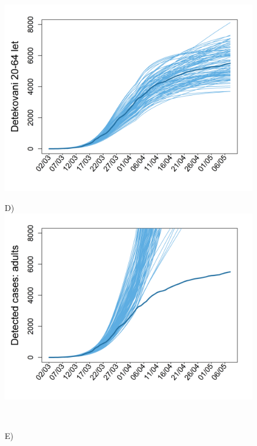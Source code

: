 \begin{figure}
\begin{center}
\begin{minipage}[m]{0.45\textwidth}
			\includegraphics[width = \textwidth]{pic/sc_bas_2.png}
		\end{minipage}
		\begin{minipage}[m]{0.45\textwidth}
			D) \\
			\includegraphics[width = \textwidth]{pic/sc_old90_30_2.png}
		\end{minipage} \\[1ex]
		\begin{minipage}[m]{0.45\textwidth}
			E) \\

\end{minipage}
\end{center}
\end{figure}
